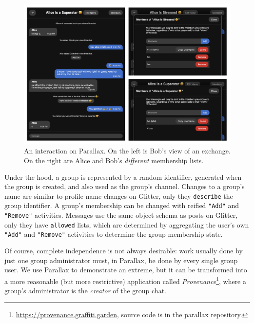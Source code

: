 \begin{figure}[h]
    \centering
    \includegraphics[width=\textwidth]{paper/figures/parallax.png}
    \caption{An interaction on Parallax. On the left is Bob's view of an exchange. On the right are Alice and Bob's \emph{different} membership lists.}

    \label{case-studies:fig:parallax}
\end{figure}

Under the hood, a group is represented by a random identifier,
generated when the group is created, and also used as the group's channel.
Changes to a group's name are similar to profile name changes on Glitter, only they
\texttt{describe} the group identifier.
A group's membership can be changed with reified \texttt{"Add"}
and \texttt{"Remove"} activities.
Messages use the same object schema as posts on Glitter,
only they have \texttt{allowed} lists, which are determined
by aggregating the user's own \texttt{"Add"} and \texttt{"Remove"} activities
to determine the group membership state.

Of course, complete independence is not always desirable:
work usually done by just one group administrator must, in Parallax,
be done by every single group user.
We use Parallax to demonstrate an extreme,
but it can be
transformed into a more reasonable (but more restrictive) application called \emph{Provenance}\footnote{
\url{https://provenance.graffiti.garden}, source code is in the parallax repository.
},
where a group's administrator is the  \emph{creator} of the group chat.

